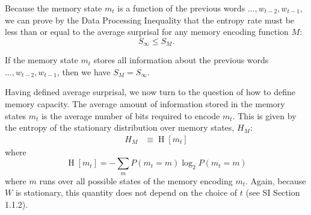  Because the memory state $m_t$ is a function of the previous words $ \dots, w_{t-2}, w_{t-1}$, we can prove by the Data Processing Inequality \citep[][pp. 34--35]{cover2006elements} that the entropy rate must be less than or equal to the average surprisal for any memory encoding function $M$:
\begin{equation*}
    S_\infty \le S_M.
\end{equation*}


If the memory state $m_t$ stores all information about the previous words $ \dots, w_{t-2}, w_{t-1}$, then we have $S_M = S_\infty$.

Having defined average surprisal, we now turn to the question of how to define memory capacity. The average amount of information stored in the memory states $m_t$ is the average number of bits required to encode $m_t$. 
This is given by the entropy of the stationary distribution over memory states, $H_M$: %
\begin{align}
    \nonumber
        H_M &\equiv \operatorname{H}[m_t] 
\end{align}
where
\begin{equation*}
    \operatorname{H}[m_t] = - \sum_m P(m_t = m) \log_2 P(m_t=m)
\end{equation*}
where $m$ runs over all possible states of the memory encoding $m_t$.
Again, because $W$ is stationary, this quantity does not depend on the choice of $t$ (see SI Section 1.1.2).


